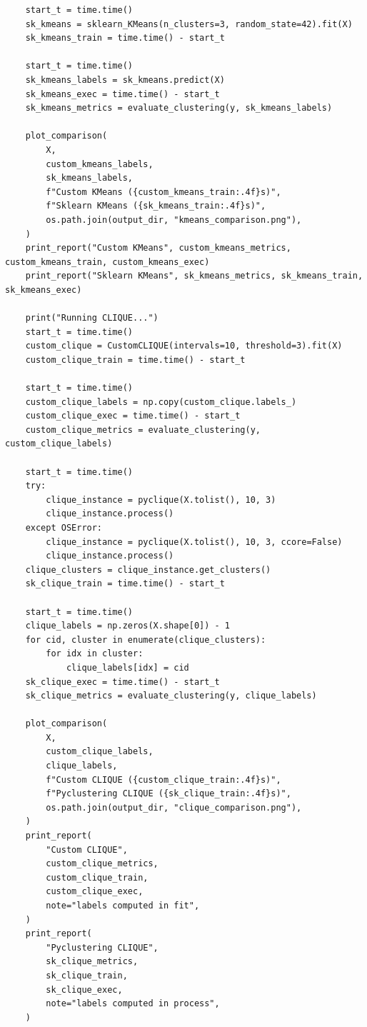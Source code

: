 \documentclass[runningheads]{ctexart}
\begin{document}
\begin{lstlisting}
    start_t = time.time()
    sk_kmeans = sklearn_KMeans(n_clusters=3, random_state=42).fit(X)
    sk_kmeans_train = time.time() - start_t

    start_t = time.time()
    sk_kmeans_labels = sk_kmeans.predict(X)
    sk_kmeans_exec = time.time() - start_t
    sk_kmeans_metrics = evaluate_clustering(y, sk_kmeans_labels)

    plot_comparison(
        X,
        custom_kmeans_labels,
        sk_kmeans_labels,
        f"Custom KMeans ({custom_kmeans_train:.4f}s)",
        f"Sklearn KMeans ({sk_kmeans_train:.4f}s)",
        os.path.join(output_dir, "kmeans_comparison.png"),
    )
    print_report("Custom KMeans", custom_kmeans_metrics, custom_kmeans_train, custom_kmeans_exec)
    print_report("Sklearn KMeans", sk_kmeans_metrics, sk_kmeans_train, sk_kmeans_exec)

    print("Running CLIQUE...")
    start_t = time.time()
    custom_clique = CustomCLIQUE(intervals=10, threshold=3).fit(X)
    custom_clique_train = time.time() - start_t

    start_t = time.time()
    custom_clique_labels = np.copy(custom_clique.labels_)
    custom_clique_exec = time.time() - start_t
    custom_clique_metrics = evaluate_clustering(y, custom_clique_labels)

    start_t = time.time()
    try:
        clique_instance = pyclique(X.tolist(), 10, 3)
        clique_instance.process()
    except OSError:
        clique_instance = pyclique(X.tolist(), 10, 3, ccore=False)
        clique_instance.process()
    clique_clusters = clique_instance.get_clusters()
    sk_clique_train = time.time() - start_t

    start_t = time.time()
    clique_labels = np.zeros(X.shape[0]) - 1
    for cid, cluster in enumerate(clique_clusters):
        for idx in cluster:
            clique_labels[idx] = cid
    sk_clique_exec = time.time() - start_t
    sk_clique_metrics = evaluate_clustering(y, clique_labels)

    plot_comparison(
        X,
        custom_clique_labels,
        clique_labels,
        f"Custom CLIQUE ({custom_clique_train:.4f}s)",
        f"Pyclustering CLIQUE ({sk_clique_train:.4f}s)",
        os.path.join(output_dir, "clique_comparison.png"),
    )
    print_report(
        "Custom CLIQUE",
        custom_clique_metrics,
        custom_clique_train,
        custom_clique_exec,
        note="labels computed in fit",
    )
    print_report(
        "Pyclustering CLIQUE",
        sk_clique_metrics,
        sk_clique_train,
        sk_clique_exec,
        note="labels computed in process",
    )


\end{lstlisting}
\end{document}

